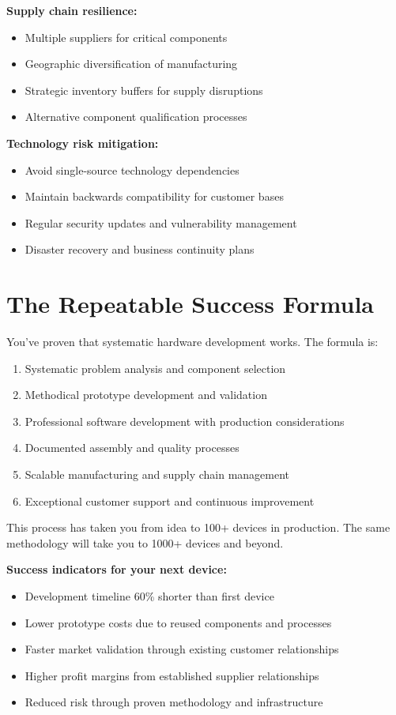\textbf{Supply chain resilience:}
\begin{itemize}
\item Multiple suppliers for critical components
\item Geographic diversification of manufacturing
\item Strategic inventory buffers for supply disruptions
\item Alternative component qualification processes
\end{itemize}

\textbf{Technology risk mitigation:}
\begin{itemize}
\item Avoid single-source technology dependencies
\item Maintain backwards compatibility for customer bases
\item Regular security updates and vulnerability management
\item Disaster recovery and business continuity plans
\end{itemize}

\section{The Repeatable Success Formula}

You've proven that systematic hardware development works. The formula is:

\begin{enumerate}
\item Systematic problem analysis and component selection
\item Methodical prototype development and validation
\item Professional software development with production considerations
\item Documented assembly and quality processes
\item Scalable manufacturing and supply chain management
\item Exceptional customer support and continuous improvement
\end{enumerate}

This process has taken you from idea to 100+ devices in production. The same methodology will take you to 1000+ devices and beyond.

\textbf{Success indicators for your next device:}
\begin{itemize}
\item Development timeline 60\% shorter than first device
\item Lower prototype costs due to reused components and processes
\item Faster market validation through existing customer relationships
\item Higher profit margins from established supplier relationships
\item Reduced risk through proven methodology and infrastructure
\end{itemize}

